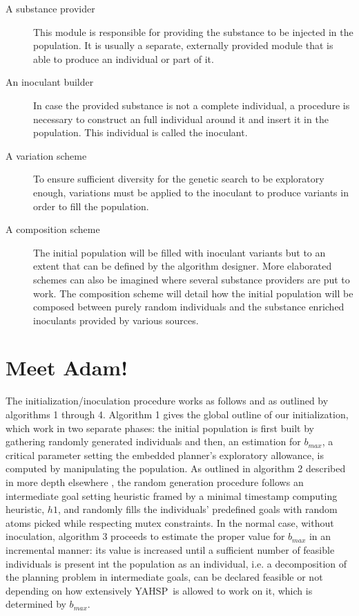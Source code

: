 \documentclass[english]{DESCARWINreport}
\newcommand{\YAHSP}{{\sc YAHSP}}
\begin{document}
\begin{description}

\item[A substance provider] 

This module is responsible for providing the substance to be injected in the population. It is usually a separate, externally provided module that is able to produce an individual or part of it.

\item[An inoculant builder] 

In case the provided substance is not a complete individual, a procedure is necessary to construct an full individual around it and insert it in the population. This individual is called the inoculant.

\item[A variation scheme] 

To ensure sufficient diversity for the genetic search to be exploratory enough, variations must be applied to the inoculant to produce variants in order to fill the population.


\item[A composition scheme] 

The initial population will be filled with inoculant variants but to an extent that can be defined by the algorithm designer. More elaborated schemes can also be imagined where several substance providers are put to work. The composition scheme will detail how the initial population will be composed between purely random individuals and the substance enriched inoculants provided by various sources.


\end{description}

\section{Meet Adam!}

The initialization/inoculation procedure works as follows and as outlined by algorithms 1 through 4. Algorithm 1 gives the global outline of our initialization, which work in two separate phases: the initial population is first built by gathering randomly generated individuals and then, an estimation for {$b_{max}$}, a critical parameter setting the embedded planner's exploratory allowance, is computed by manipulating the population. As outlined in algorithm 2 described in more depth elsewhere \cite{DBLP:conf/aips/BibaiSSV10}, the random generation procedure follows an intermediate goal setting heuristic framed by a minimal timestamp computing heuristic, {$h1$}, and randomly fills the individuals' predefined goals with random atoms picked while respecting mutex constraints. In the normal case, without inoculation, algorithm 3 proceeds to estimate the proper value for {$b_{max}$} in an incremental manner: its value is increased until a sufficient number of feasible individuals is present int the population as an individual, i.e. a decomposition of the planning problem in intermediate goals, can be declared feasible or not depending on how extensively \YAHSP\ is allowed to work on it, which is determined by {$b_{max}$}.
\end{document}
